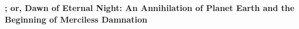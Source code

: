\vspace*{-.5\baselineskip}
\textbf{; or, Dawn of Eternal Night: An Annihilation of Planet Earth and the Beginning of Merciless Damnation}



